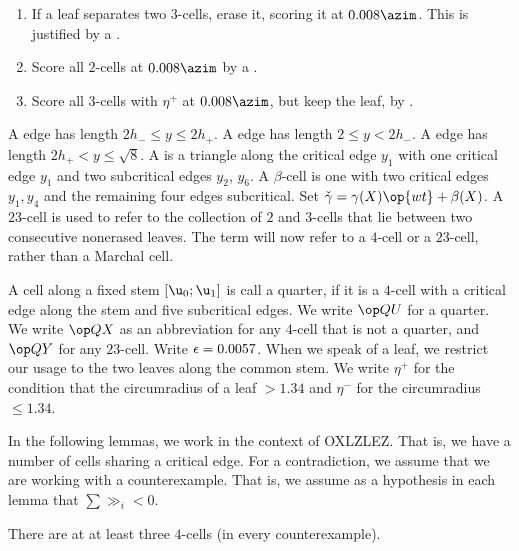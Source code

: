 \begin{remark}[preparation]
\begin{enumerate}
\item If a leaf separates two $3$-cells, erase it, scoring it at $0.008\azim$.  This is justified by
a .
\item Score all $2$-cells at $0.008\azim$ by a .
\item Score all $3$-cells with $\eta ^+$ at $0.008\azim$, but keep the leaf, by .
\end{enumerate}
\end{remark}

\begin{definition}
A  edge has length $2h_-\le y\le 2h_+$.  A  edge has length $2\le y< 2h_-$.
A  edge has length $2h_+<y\le\sqrt8$.
A  is a triangle along the critical edge $y_1$ with one critical edge $y_1$ and two
subcritical edges $y_2$, $y_6$.
A $\beta$-cell is one with two critical edges $y_1,y_4$ and the remaining four edges subcritical.
Set $\gg = \gamma(X)\op{wt} + \beta(X)$.
A $23$-cell is used to refer to the collection of $2$ and $3$-cells that lie between two consecutive nonerased leaves.  The term  will now refer to a $4$-cell or a $23$-cell,
rather than a Marchal cell.

A cell along a fixed stem $[\u_0;\u_1]$ is call a quarter, if it
 is a $4$-cell with a critical edge along the stem and five subcritical edges.
We write $\QU$ for a quarter.
We write $\QX$ as an abbreviation for any $4$-cell that is not a quarter,
and $\QY$ for any $23$-cell. Write $\epsilon=0.0057$.
When we speak of a leaf, we restrict our usage to the two leaves along the common stem.
We write $\eta^+$ for the condition that the circumradius of a leaf $>1.34$ and
$\eta^-$ for the circumradius $\le 1.34$.
\end{definition}

In the following lemmas, we work in the context of OXLZLEZ.  That is, we have a number of cells sharing
a critical edge.  For a contradiction, we assume that we are working with a counterexample.  That is,
we assume as a hypothesis in each lemma that $\sum \gg_i < 0$.

\begin{lemma}\label{lemma:ox34}
There are at at least three $4$-cells (in every counterexample).
\end{lemma}


